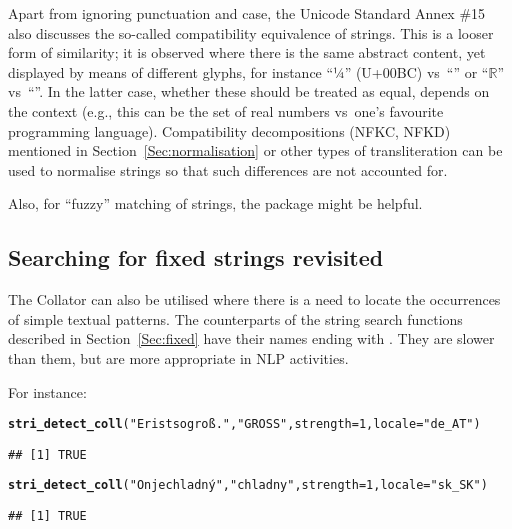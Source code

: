 \documentclass[nojss]{jss}\usepackage[]{graphicx}\usepackage[]{xcolor}
\makeatletter
\newcommand{\hlnum}[1]{\textcolor[rgb]{0.686,0.059,0.569}{#1}}%
\newcommand{\hlstr}[1]{\textcolor[rgb]{0.192,0.494,0.8}{#1}}%
\newcommand{\hlstd}[1]{\textcolor[rgb]{0.345,0.345,0.345}{#1}}%
\newcommand{\hlkwc}[1]{\textcolor[rgb]{0.333,0.667,0.333}{#1}}%
\newcommand{\hlkwd}[1]{\textcolor[rgb]{0.737,0.353,0.396}{\textbf{#1}}}%
\newenvironment{kframe}{%
 \def\at@end@of@kframe{}%
 \ifinner\ifhmode%
  \def\at@end@of@kframe{\end{minipage}}%
  \begin{minipage}{\columnwidth}%
 \fi\fi%
 \def\FrameCommand##1{\hskip\@totalleftmargin \hskip-\fboxsep
 \colorbox{shadecolor}{##1}\hskip-\fboxsep
     \hskip-\linewidth \hskip-\@totalleftmargin \hskip\columnwidth}%
 \MakeFramed {\advance\hsize-\width
   \@totalleftmargin\z@ \linewidth\hsize
   \@setminipage}}%
 {\par\unskip\endMakeFramed%
 \at@end@of@kframe}
\newenvironment{knitrout}{}{} %
\makeatother
\begin{document}
Apart from ignoring punctuation and case, the Unicode Standard Annex \#15 \citep{usa15:normalization}
also discusses the so-called compatibility equivalence of strings.
This is a looser form of similarity; it is observed where
there is the same abstract content, yet displayed
by means of different glyphs, for instance ``¼'' (U+00BC) vs~``''
or ``$\mathbb{R}$'' vs~``''.
In the latter case, whether these should be treated as equal,
depends on the context (e.g., this can be the set of real numbers
vs~one's favourite programming language).
Compatibility decompositions (NFKC, NFKD)
mentioned in Section~\ref{Sec:normalisation}
or other types of transliteration can be used to normalise strings so that
such differences are not accounted for.

Also, for ``fuzzy'' matching of strings,
the  package \citep{stringdist} might be helpful.













\subsection{Searching for fixed strings revisited}

The  Collator can also be utilised
where there is a need to locate the occurrences of simple textual patterns.
The counterparts of the string search functions
described in Section~\ref{Sec:fixed}
have their names ending with .
They are slower than them, but are more appropriate in NLP activities.

For instance:

\begin{knitrout}
\color{fgcolor}\begin{kframe}
\begin{alltt}
\hlkwd{stri_detect_coll}\hlstd{(}\hlstr{"Er ist so groß."}\hlstd{,} \hlstr{"GROSS"}\hlstd{,} \hlkwc{strength}\hlstd{=}\hlnum{1}\hlstd{,} \hlkwc{locale}\hlstd{=}\hlstr{"de_AT"}\hlstd{)}
\end{alltt}
\begin{verbatim}
## [1] TRUE
\end{verbatim}
\begin{alltt}
\hlkwd{stri_detect_coll}\hlstd{(}\hlstr{"On je chladný"}\hlstd{,} \hlstr{"chladny"}\hlstd{,} \hlkwc{strength}\hlstd{=}\hlnum{1}\hlstd{,} \hlkwc{locale}\hlstd{=}\hlstr{"sk_SK"}\hlstd{)}
\end{alltt}
\begin{verbatim}
## [1] TRUE
\end{verbatim}
\end{kframe}
\end{knitrout}
\end{document}
